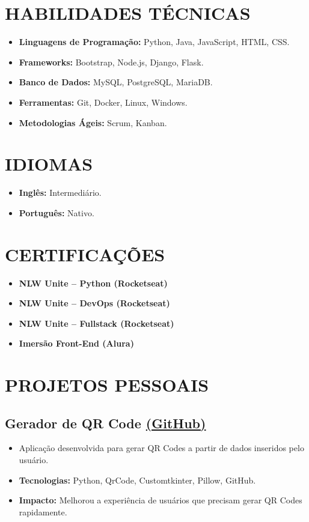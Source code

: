 \documentclass[a4paper,10pt]{article}
\begin{document}
\section{HABILIDADES TÉCNICAS}
\begin{itemize}
    \item \textbf{Linguagens de Programação:} Python, Java, JavaScript, HTML, CSS.
    \item \textbf{Frameworks:} Bootstrap, Node.js, Django, Flask.
    \item \textbf{Banco de Dados:} MySQL, PostgreSQL, MariaDB.
    \item \textbf{Ferramentas:} Git, Docker, Linux, Windows.
    \item \textbf{Metodologias Ágeis:} Scrum, Kanban.
\end{itemize}

\section{IDIOMAS}
\begin{itemize}
    \item \textbf{Inglês:} Intermediário.
    \item \textbf{Português:} Nativo.
\end{itemize}

\section{CERTIFICAÇÕES}
\begin{itemize}
    \item \textbf{NLW Unite – Python (Rocketseat)}
    \item \textbf{NLW Unite – DevOps (Rocketseat)}
    \item \textbf{NLW Unite – Fullstack (Rocketseat)}
    \item \textbf{Imersão Front-End (Alura)}
\end{itemize}

\section{PROJETOS PESSOAIS}
\subsection*{Gerador de QR Code \href{https://github.com/Isllanrx/Qr-Code-Python}{(GitHub)}}
\begin{itemize}
    \item Aplicação desenvolvida para gerar QR Codes a partir de dados inseridos pelo usuário.
    \item \textbf{Tecnologias:} Python, QrCode, Customtkinter, Pillow, GitHub.
    \item \textbf{Impacto:} Melhorou a experiência de usuários que precisam gerar QR Codes rapidamente.
\end{itemize}
\end{document}
